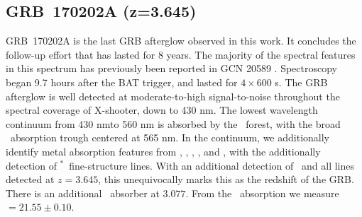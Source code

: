 \documentclass{aa}    %
\begin{document}
\subsection{GRB~170202A (z=3.645)}\label{170202}

GRB~170202A is the last GRB afterglow observed in this work. It concludes the
follow-up effort that has lasted for 8 years. The majority of the spectral
features in this spectrum has previously been reported in GCN 20589
\citep{GCN20589}. Spectroscopy began 9.7 hours after the BAT trigger, and lasted
for $4 \times 600$ s. The GRB afterglow is well detected at moderate-to-high
signal-to-noise throughout the spectral coverage of X-shooter, down to 430 nm.
The lowest wavelength continuum from 430 nmto 560 nm is absorbed by the
\lya~forest, with the broad \lya~absorption trough centered at 565 nm. In the
continuum, we additionally identify metal absorption features from \SIii, \civ,
\SIiv, \feii, and \mgii, with the additionally detection of
\SIii$^*$~fine-structure lines. With an additional detection of \oiii~and all
lines detected at $z=3.645$, this unequivocally marks this as the redshift of
the GRB. There is an additional \civ~absorber at $3.077$. From the
\lya~absorption we measure \nh$= 21.55 \pm 0.10$.

%
%
\end{document}
